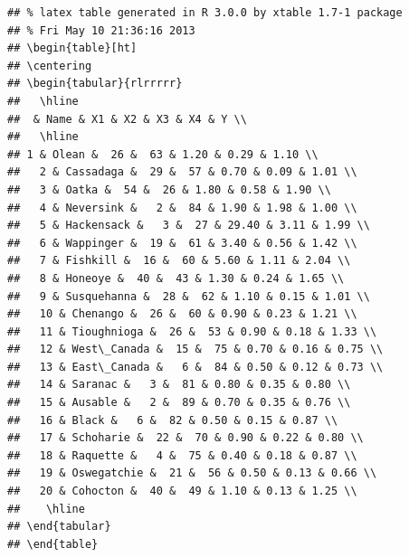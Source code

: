 \documentclass{article}\usepackage{graphicx, color}
\makeatletter
\newenvironment{kframe}{%
 \def\at@end@of@kframe{}%
 \ifinner\ifhmode%
  \def\at@end@of@kframe{\end{minipage}}%
  \begin{minipage}{\columnwidth}%
 \fi\fi%
 \def\FrameCommand##1{\hskip\@totalleftmargin \hskip-\fboxsep
 \colorbox{shadecolor}{##1}\hskip-\fboxsep
     \hskip-\linewidth \hskip-\@totalleftmargin \hskip\columnwidth}%
 \MakeFramed {\advance\hsize-\width
   \@totalleftmargin\z@ \linewidth\hsize
   \@setminipage}}%
 {\par\unskip\endMakeFramed%
 \at@end@of@kframe}
\newenvironment{knitrout}{}{} %
\numberwithin{equation}{section}
\makeatother
\begin{document}
\begin{flushleft}
\begin{enumerate}[1. ]
\begin{center}
\begin{knitrout}
\color{fgcolor}\begin{kframe}
\begin{verbatim}
## % latex table generated in R 3.0.0 by xtable 1.7-1 package
## % Fri May 10 21:36:16 2013
## \begin{table}[ht]
## \centering
## \begin{tabular}{rlrrrrr}
##   \hline
##  & Name & X1 & X2 & X3 & X4 & Y \\ 
##   \hline
## 1 & Olean &  26 &  63 & 1.20 & 0.29 & 1.10 \\ 
##   2 & Cassadaga &  29 &  57 & 0.70 & 0.09 & 1.01 \\ 
##   3 & Oatka &  54 &  26 & 1.80 & 0.58 & 1.90 \\ 
##   4 & Neversink &   2 &  84 & 1.90 & 1.98 & 1.00 \\ 
##   5 & Hackensack &   3 &  27 & 29.40 & 3.11 & 1.99 \\ 
##   6 & Wappinger &  19 &  61 & 3.40 & 0.56 & 1.42 \\ 
##   7 & Fishkill &  16 &  60 & 5.60 & 1.11 & 2.04 \\ 
##   8 & Honeoye &  40 &  43 & 1.30 & 0.24 & 1.65 \\ 
##   9 & Susquehanna &  28 &  62 & 1.10 & 0.15 & 1.01 \\ 
##   10 & Chenango &  26 &  60 & 0.90 & 0.23 & 1.21 \\ 
##   11 & Tioughnioga &  26 &  53 & 0.90 & 0.18 & 1.33 \\ 
##   12 & West\_Canada &  15 &  75 & 0.70 & 0.16 & 0.75 \\ 
##   13 & East\_Canada &   6 &  84 & 0.50 & 0.12 & 0.73 \\ 
##   14 & Saranac &   3 &  81 & 0.80 & 0.35 & 0.80 \\ 
##   15 & Ausable &   2 &  89 & 0.70 & 0.35 & 0.76 \\ 
##   16 & Black &   6 &  82 & 0.50 & 0.15 & 0.87 \\ 
##   17 & Schoharie &  22 &  70 & 0.90 & 0.22 & 0.80 \\ 
##   18 & Raquette &   4 &  75 & 0.40 & 0.18 & 0.87 \\ 
##   19 & Oswegatchie &  21 &  56 & 0.50 & 0.13 & 0.66 \\ 
##   20 & Cohocton &  40 &  49 & 1.10 & 0.13 & 1.25 \\ 
##    \hline
## \end{tabular}
## \end{table}
\end{verbatim}
\end{kframe}
\end{knitrout}


\end{center}
\end{enumerate}
\end{flushleft}
\end{document}
